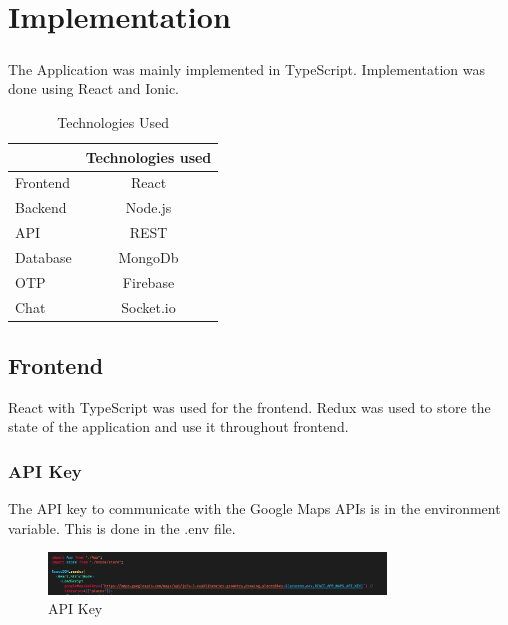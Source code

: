 \chapter{Implementation}

    \paragraph*{}
        The Application was mainly implemented in TypeScript. Implementation was done using React and Ionic.

        \begin{table}[htb]
            \centering
            \begin{tabular}{ | l | c | }
                \hline
                 & Technologies used \\
                \hline
                \hline
                Frontend & React \\ 
                \hline
                Backend & Node.js \\
                \hline
                API & REST\\
                \hline
                Database & MongoDb\\
                \hline
                OTP & Firebase  \\
                \hline
                Chat & Socket.io \\
                \hline
            \end{tabular}
            \caption{Technologies Used}
            \label{tab:Technologies}
        \end{table}


    \section{Frontend}

    React with TypeScript was used for the frontend. Redux was used to store the state of the application and use it throughout frontend.
        
    \subsection{API Key}
    The API key to communicate with the Google Maps APIs is in the environment variable. This is done in the .env file.
        \begin{figure}[h]
            \centering
            \includegraphics[width=0.8\textwidth]{images/APIkey.png}
            \caption{API Key}
            \label{fig:API}
        \end{figure}

